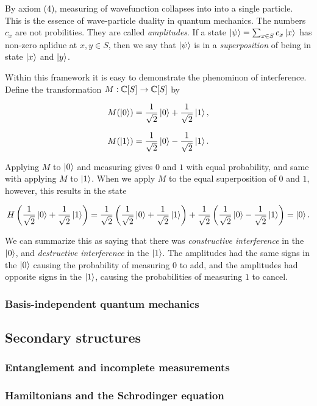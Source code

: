 \documentclass{article}
\theoremstyle{definition}
\numberwithin{figure}{section}
\begin{document}
By axiom (4), measuring of wavefunction collapses into into a single particle. This is the essence of wave-particle duality in quantum mechanics. The numbers $c_x$ are not probilities. They are called \textit{amplitudes}. If a state $\ket{\psi}=\sum_{x\in S}c_x \ket{x}$ has non-zero aplidue at $x,y\in S$, then we say that $\ket{\psi}$ is in a \textit{superposition} of being in state $\ket{x}$ and $\ket{y}$.

Within this framework it is easy to demonstrate the phenominon of interference. Define the transformation $M: \mathbb{C}[S]\to \mathbb{C}[S]$ by

$$M(\left|0\right>)=\frac{1}{\sqrt{2}}\left|0\right>+\frac{1}{\sqrt{2}}\left|1\right>,$$

$$M(\left|1\right>)=\frac{1}{\sqrt{2}}\left|0\right>-\frac{1}{\sqrt{2}}\left|1\right>.$$

Applying $M$ to $\left|0\right>$ and measuring gives $0$ and $1$ with equal probability, and same with applying $M$ to $\left|1\right>$. When we apply $M$ to the equal superposition of $0$ and $1$, however, this results in the state

$$H\left(\frac{1}{\sqrt{2}}\left|0\right>+\frac{1}{\sqrt{2}}\left|1\right>\right)=\frac{1}{\sqrt{2}}\left(\frac{1}{\sqrt{2}}\left|0\right>+\frac{1}{\sqrt{2}}\left|1\right>\right)+\frac{1}{\sqrt{2}}\left(\frac{1}{\sqrt{2}}\left|0\right>-\frac{1}{\sqrt{2}}\left|1\right>\right)=\left|0\right>.$$

We can summarize this as saying that there was \textit{constructive interference} in the $\left|0\right>$, and \textit{destructive interference} in the $\left|1\right>$. The amplitudes had the same signs in the $\left|0\right>$ causing the probability of measuring $0$ to add, and the amplitudes had opposite signs in the $\left|1\right>$, causing the probabilities of measuring $1$ to cancel. 





\subsubsection{Basis-independent quantum mechanics}

\subsection{Secondary structures}

\subsubsection{Entanglement and incomplete measurements}

\subsubsection{Hamiltonians and the Schrodinger equation}
\end{document}
